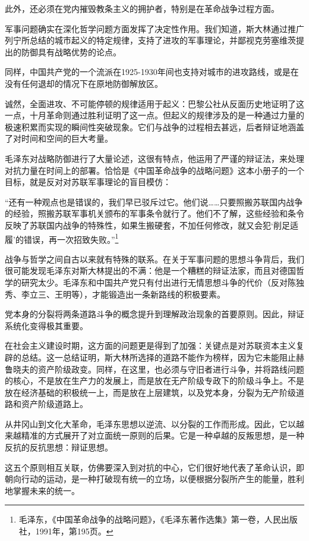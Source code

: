 \documentclass[fontset=fandol, a4paper, 12pt, twoside]{ctexart}
\renewenvironment{quote}
  {\list{}{\rightmargin=0cm \leftmargin=2em}%
   \item\relax\small\kaishu\color{black}}
  {\endlist}
\begin{document}
此外，还必须在党内摧毁教条主义的拥护者，特别是在革命战争过程方面。

军事问题确实在深化哲学问题方面发挥了决定性作用。我们知道，斯大林通过推广列宁所总结的城市起义的特定规律，支持了进攻的军事理论，并鄙视克劳塞维茨提出的防御具有战略优势的论点。

同样，中国共产党的一个流派在1925-1930年间也支持对城市的进攻路线，或是在没有任何退却的情况下在原地防御解放区。

诚然，全面进攻、不可能停顿的规律适用于起义：巴黎公社从反面历史地证明了这一点，十月革命则通过胜利证明了这一点。但起义的规律涉及的是一种通过力量的极速积累而实现的瞬间性突破现象。它们与战争的过程相去甚远，后者辩证地涵盖了对时间和空间的巨大考量。

毛泽东对战略防御进行了大量论述，这很有特点，他运用了严谨的辩证法，来处理对抗力量在时间上的部署。恰恰是《中国革命战争的战略问题》这本小册子的一个目标，就是反对对苏联军事理论的盲目模仿：

\begin{quote}
“还有一种观点也是错误的，我们早已驳斥过它。他们说……只要照搬苏联国内战争的经验，照搬苏联军事机关颁布的军事条令就行了。他们不了解，这些经验和条令反映了苏联国内战争的特殊性，如果生搬硬套，不加任何修改，就又会犯‘削足适履’的错误，再一次招致失败。”\footnote{毛泽东，《中国革命战争的战略问题》，《毛泽东著作选集》第一卷，人民出版社，1991年，第195页。}
\end{quote}

战争与哲学之间自古以来就有特殊的联系。在关于军事问题的思想斗争背后，我们很可能发现毛泽东对斯大林提出的不满：他是一个糟糕的辩证法家，而且对德国哲学的研究太少。毛泽东和中国共产党只有付出进行无情思想斗争的代价（反对陈独秀、李立三、王明等），才能锻造出一条新路线的积极要素。

党本身的分裂将两条道路斗争的概念提升到理解政治现象的首要原则。因此，辩证系统化变得极其重要。

在社会主义建设时期，这方面的问题更是得到了加强：关键点是对苏联资本主义复辟的总结。这一总结证明，斯大林所选择的道路不能作为榜样，因为它未能阻止赫鲁晓夫的资产阶级政变。同样，在这里，也必须与守旧者进行斗争，并将路线问题的核心，不是放在生产力的发展上，而是放在无产阶级专政下的阶级斗争上。不是放在经济基础的积极统一上，而是放在上层建筑，以及党本身，分裂为无产阶级道路和资产阶级道路上。

从井冈山到文化大革命，毛泽东思想以逆流、以分裂的工作而形成。因此，它以越来越精准的方式展开了对立面统一原则的后果。它是一种卓越的反叛思想，是一种反抗的反抗思想：辩证思想。

这五个原则相互关联，仿佛要深入到对抗的中心，它们很好地代表了革命认识，即朝向行动的运动，是一种打破现有统一的立场，以便根据分裂所产生的能量，胜利地掌握未来的统一。
\end{document}
